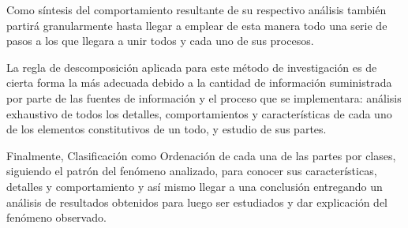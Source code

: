 \documentclass[a4paper, 12pt, oneside]{article}
\theoremstyle{definition}
\theoremstyle{remark}
\begin{document}
Como síntesis del comportamiento resultante de su respectivo análisis también partirá granularmente hasta llegar a emplear de esta manera todo una serie de pasos a los que llegara a unir todos y cada uno de sus procesos.

La regla de descomposición aplicada para este método de investigación es de cierta forma la más adecuada debido a la cantidad de información suministrada por parte de las fuentes de información y el proceso que se implementara: análisis exhaustivo de todos los detalles,
comportamientos y características de cada uno de los elementos constitutivos de un todo, y estudio de sus partes.

Finalmente, Clasificación como Ordenación de cada una de las partes por clases, siguiendo el patrón del fenómeno analizado, para conocer sus características, detalles y comportamiento y así mismo llegar a una conclusión entregando un análisis de resultados obtenidos para luego ser estudiados y dar explicación del fenómeno observado.
\end{document}
